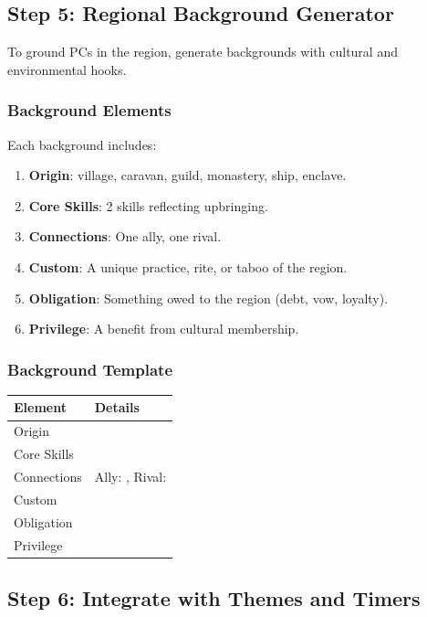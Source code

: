 \documentclass[11pt]{article}
\begin{document}
\subsection{Step 5: Regional Background Generator}

To ground PCs in the region, generate backgrounds with cultural and environmental hooks.

\subsubsection{Background Elements}
Each background includes:
\begin{enumerate}
    \item \textbf{Origin}: village, caravan, guild, monastery, ship, enclave.
    \item \textbf{Core Skills}: 2 skills reflecting upbringing.
    \item \textbf{Connections}: One ally, one rival.
    \item \textbf{Custom}: A unique practice, rite, or taboo of the region.
    \item \textbf{Obligation}: Something owed to the region (debt, vow, loyalty).
    \item \textbf{Privilege}: A benefit from cultural membership.
\end{enumerate}

\subsubsection{Background Template}
\begin{center}
\begin{longtable}{|p{4cm}|p{7cm}|}
\hline
\textbf{Element} & \textbf{Details} \\
\hline
Origin & \underline{\phantom{XXXXXXXXXXXXXXXX}} \\
Core Skills & \underline{\phantom{XXXXXXXXXXXX}} \\
Connections & Ally: \underline{\phantom{XXXXX}}, Rival: \underline{\phantom{XXXXX}} \\
Custom & \underline{\phantom{XXXXXXXXXXXXXX}} \\
Obligation & \underline{\phantom{XXXXXXXX}} \\
Privilege & \underline{\phantom{XXXXXXXX}} \\
\hline
\end{longtable}
\end{center}

\subsection{Step 6: Integrate with Themes and Timers}
\end{document}
